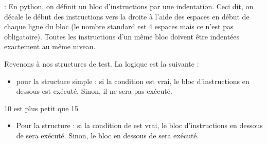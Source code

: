 \documentclass[letterpaper,10pt,french]{sphinxmanual}
\begin{document}
\sphinxAtStartPar
{}: En python, on définit un bloc d’instructions par une indentation. Ceci dit, on décale le début des instructions vers la droite à l’aide des espaces en début de chaque ligne du bloc (le nombre standard est 4 espaces mais ce n’est pas obligatoire). Toutes les instructions d’un même bloc doivent être indentées exactement au même niveau.

\sphinxAtStartPar
Revenons à nos structures de test. La logique est la suivante :
\begin{itemize}
\item {} 
\sphinxAtStartPar
pour la structure simple : si  la condition est vrai, le bloc d’instructions en dessous est exécuté. Sinon, il ne sera pas exécuté.

\end{itemize}

\begin{sphinxVerbatim}[commandchars=\\\{\}]
  
   
     
\end{sphinxVerbatim}

\begin{sphinxVerbatim}[commandchars=\\\{\}]
10 est plus petit que 15
\end{sphinxVerbatim}

\begin{sphinxVerbatim}[commandchars=\\\{\}]
  
   
     
\end{sphinxVerbatim}
\begin{itemize}
\item {} 
\sphinxAtStartPar
Pour la structure  : si la condition de  est vrai, le bloc d’instructions en dessous de  sera exécuté. Sinon, le bloc en dessous de  sera exécuté.

\end{itemize}
\end{document}
